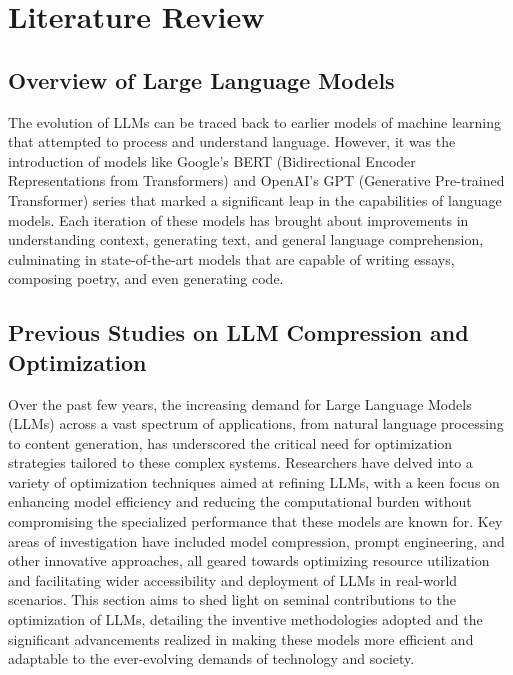 \chapter{Literature Review}

\section{Overview of Large Language Models}
    The evolution of LLMs can be traced back to earlier models of machine learning that attempted to process and understand language. However, it was the introduction of models like Google's BERT (Bidirectional Encoder Representations from Transformers) and OpenAI's GPT (Generative Pre-trained Transformer) series that marked a significant leap in the capabilities of language models. Each iteration of these models has brought about improvements in understanding context, generating text, and general language comprehension, culminating in state-of-the-art models that are capable of writing essays, composing poetry, and even generating code.
    

\section{Previous Studies on LLM Compression and Optimization}

    Over the past few years, the increasing demand for Large Language Models (LLMs) across a vast spectrum of applications, from natural language processing to content generation, has underscored the critical need for optimization strategies tailored to these complex systems. Researchers have delved into a variety of optimization techniques aimed at refining LLMs, with a keen focus on enhancing model efficiency and reducing the computational burden without compromising the specialized performance that these models are known for. 
    Key areas of investigation have included model compression, prompt engineering, and other innovative approaches, all geared towards optimizing resource utilization and facilitating wider accessibility and deployment of LLMs in real-world scenarios. This section aims to shed light on seminal contributions to the optimization of LLMs, detailing the inventive methodologies adopted and the significant advancements realized in making these models more efficient and adaptable to the ever-evolving demands of technology and society.
    
